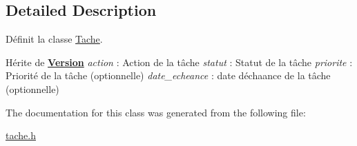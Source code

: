 \subsection{Detailed Description}
Définit la classe \hyperlink{class_tache}{Tache}. 

Hérite de {\bfseries \hyperlink{class_version}{Version}} {\itshape action} \+: Action de la tâche {\itshape statut} \+: Statut de la tâche {\itshape priorite} \+: Priorité de la tâche (optionnelle) {\itshape date\+\_\+echeance} \+: date d\textquotesingle{}échaance de la tâche (optionnelle) 

The documentation for this class was generated from the following file\+:\begin{DoxyCompactItemize}
\item 
\hyperlink{tache_8h}{tache.\+h}\end{DoxyCompactItemize}
